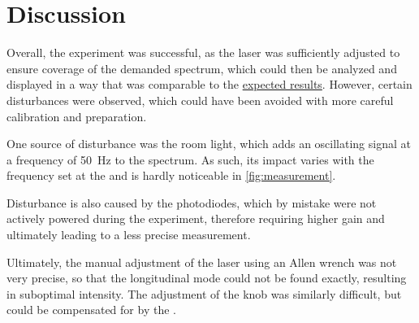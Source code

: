 \section{Discussion}
\label{sec:diskussion}


Overall,
the experiment was successful,
as the laser was sufficiently adjusted to ensure coverage of the demanded spectrum,
which could then be analyzed and displayed in a way that was comparable to the \hyperref[fig:measurement_lit]{expected results}.
%
However,
certain disturbances were observed,
which could have been avoided with more careful calibration and preparation.

One source of disturbance was the room light,
which adds an oscillating signal at a frequency of \SI{50}{\hertz} to the spectrum.
As such,
its impact varies with the frequency set at the 
and is hardly noticeable in \autoref{fig:measurement}.

Disturbance is also caused by the photodiodes,
which by mistake were not actively powered during the experiment,
therefore requiring higher gain
and ultimately leading to a less precise measurement.

Ultimately,
the manual adjustment of the laser using an Allen wrench was not very precise,
so that the longitudinal mode could not be found exactly,
resulting in suboptimal intensity.
The adjustment of the  knob was similarly difficult,
but could be compensated for by the .

